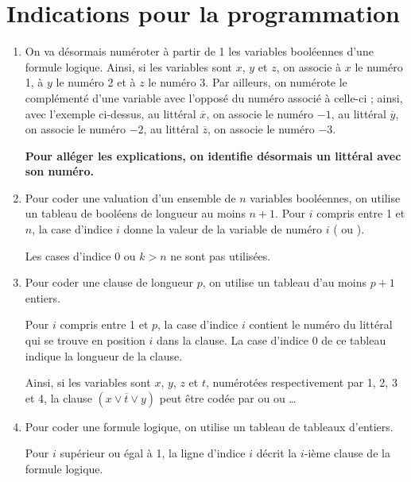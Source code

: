 \section*{Indications pour la programmation}
\begin{enumerate}
  \item On va désormais numéroter à partir de 1 les variables booléennes d’une formule logique.
Ainsi, si les variables sont $x$, $y$ et $z$, on associe à $x$ le numéro 1, à $y$ le numéro 2 et à $z$ le
numéro 3. Par ailleurs, on numérote le complémenté d’une variable avec l’opposé du numéro
associé à celle-ci ; ainsi, avec l’exemple ci-dessus, au littéral $\overline x$, on associe le numéro $-1$, au
littéral $\overline y$, on associe le numéro $-2$, au littéral $\overline z$, on associe le numéro $-3$. 

{\bf Pour alléger les explications, on identifie désormais un littéral avec son numéro.}
\item Pour coder une valuation d’un ensemble de $n$ variables booléennes, on utilise un tableau de booléens de longueur au moins $n + 1$. Pour $i$ compris entre 1 et $n$, la case d’indice $i$ donne la
valeur de la variable de numéro $i$ ( ou ). 

Les cases d’indice 0 ou $k> n$ ne sont pas utilisées.
\item Pour coder une clause de longueur $p$, on utilise un tableau d’au moins $p + 1$ entiers.

Pour $i$ compris entre 1 et $p$, la case d’indice $i$ contient le numéro du littéral qui se
trouve en position $i$ dans la clause. La case d’indice 0 de ce tableau indique la longueur de la
clause. 

Ainsi, si les variables sont $x$, $y$, $z$ et $t$, numérotées respectivement par 1, 2, 3 et 4, la
clause $(x \lor \overline t \lor y)$ peut être codée par 
\type{[|3; 1; -4; 2|]} ou \type{[|3; 1; -4; 2; 5|]} ou \dots
\item Pour coder une formule logique, on utilise un tableau de tableaux d’entiers.

Pour $i$ supérieur ou égal à 1, la ligne d’indice $i$ décrit la $i$-ième clause de la formule logique. 


\end{enumerate}
